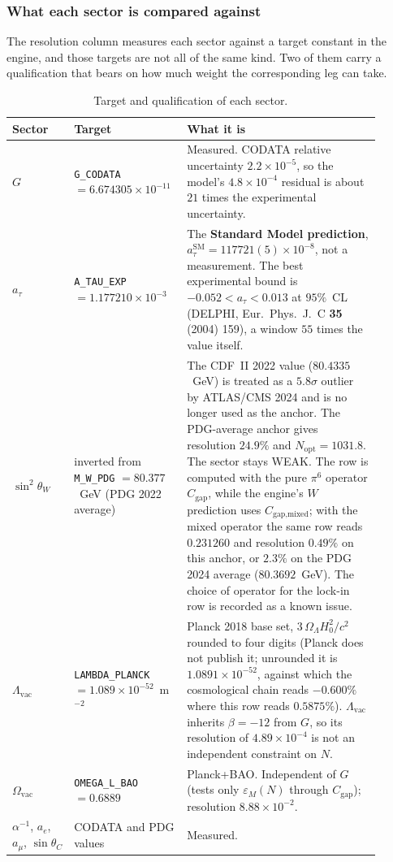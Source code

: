 \documentclass[10pt,a4paper]{article}
\begin{document}
\subsubsection{What each sector is compared against}

The resolution column measures each sector against a target constant in
the engine, and those targets are not all of the same kind. Two of them
carry a qualification that bears on how much weight the corresponding leg
can take.

\begin{table}[h!]
	\centering
	\small
	\caption{Target and qualification of each sector.}
	\label{tab:lock_in_targets}
	\begin{tabular}{p{0.16\linewidth} p{0.24\linewidth} p{0.50\linewidth}}
		\toprule
		\textbf{Sector} & \textbf{Target} & \textbf{What it is} \\
		\midrule
		$G$ & \texttt{G\_CODATA} $= 6.674305 \times 10^{-11}$
		& Measured. CODATA relative uncertainty $2.2 \times 10^{-5}$,
		so the model's $4.8 \times 10^{-4}$ residual is about
		$21$ times the experimental uncertainty. \\
		$a_\tau$ & \texttt{A\_TAU\_EXP} $= 1.177210 \times 10^{-3}$
		& The \textbf{Standard Model prediction},
		$a_\tau^{\text{SM}} = 117721(5) \times 10^{-8}$, not a
		measurement. The best experimental bound is
		$-0.052 < a_\tau < 0.013$ at $95\%$~CL (DELPHI,
		Eur.~Phys.~J.~C \textbf{35} (2004) 159), a window
		$55$ times the value itself. \\
		$\sin^2\theta_W$ & inverted from \texttt{M\_W\_PDG}
		$= 80.377$~GeV (PDG 2022 average)
		& The CDF~II 2022 value ($80.4335$~GeV) is treated as a
		$5.8\sigma$ outlier by ATLAS/CMS 2024 and is no longer
		used as the anchor. The PDG-average anchor gives
		resolution $24.9\%$ and $N_{\text{opt}} = 1031.8$. The
		sector stays WEAK. The row is computed with the pure
		$\pi^6$ operator $C_{\text{gap}}$, while the engine's
		$W$ prediction uses $C_{\text{gap,mixed}}$; with the
		mixed operator the same row reads $0.231260$ and
		resolution $0.49\%$ on this anchor, or $2.3\%$ on the
		PDG 2024 average ($80.3692$~GeV). The choice of
		operator for the lock-in row is recorded as a known
		issue. \\
		$\Lambda_{\text{vac}}$ & \texttt{LAMBDA\_PLANCK}
		$= 1.089 \times 10^{-52}$~m$^{-2}$
		& Planck 2018 base set, $3\,\Omega_\Lambda H_0^2/c^2$
		rounded to four digits (Planck does not publish it;
		unrounded it is $1.0891 \times 10^{-52}$, against which
		the cosmological chain reads $-0.600\%$ where this row
		reads $0.5875\%$). $\Lambda_{\text{vac}}$ inherits
		$\beta = -12$ from $G$, so its resolution of
		$4.89 \times 10^{-4}$ is not an independent constraint
		on $N$. \\
		$\Omega_{\text{vac}}$ & \texttt{OMEGA\_L\_BAO} $= 0.6889$
		& Planck+BAO. Independent of $G$ (tests only
		$\varepsilon_M(N)$ through $C_{\text{gap}}$); resolution
		$8.88 \times 10^{-2}$. \\
		$\alpha^{-1}$, $a_e$, $a_\mu$, $\sin\theta_C$
		& CODATA and PDG values & Measured. \\
		\bottomrule
	\end{tabular}
\end{table}
\end{document}
